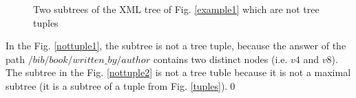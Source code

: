 \begin{example}
\begin{figure}[h]
    \centering
	\caption{Two subtrees of the XML tree of Fig. \ref{example1} which are not tree tuples}
    \label{nottuples}
\end{figure}

In the Fig. \ref{nottuple1}, the subtree is not a tree tuple, because the answer of the path $/bib/book/written\_by/author$ contains two distinct nodes (i.e. $v4$ and $v8$). The subtree in the Fig. \ref{nottuple2} is not a tree tuble because it is not a maximal subtree (it is a subtree of a tuple from Fig. \ref{tuples}).\qed

\end{example}

